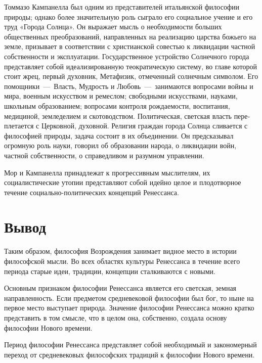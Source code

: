 \documentclass[14pt]{extarticle}
\begin{document}
Томмазо Кампанелла был одним из представителей итальянской философии природы; од­нако более значительную роль сыграло его социаль­ное учение и его труд «Города Солнца». Он выражает мысль о необходимости больших общественных преобразований, направленных на реа­лизацию царства божьего на земле, призывает в соот­ветствии с христианской совестью к ликвидации част­ной собственности и эксплуатации. Государственное устройство Солнечного города представляет собой идеализированную теократиче­скую систему, во главе которой стоит жрец, первый духовник, Метафизик, отмеченный солнечным симво­лом. Его помощники~---~Власть, Мудрость и Любовь~---~занимаются вопросами войны и мира, военным ис­кусством и ремеслом; свободными искусствами, нау­ками, школьным образованием; вопросами контроля рождаемости, воспитания, медициной, земледелием и скотоводством. Политическая, светская власть пере­плетается с Церковной, духовной. Религия граждан города Солнца сливается с философией природы, за­дача состоит в их объединении. Он предсказывал огромную роль науки, говорил об образовании народа, о ликви­дации войн, частной собственности, о справедливом и разумном управлении.

Мор и Кампанелла принадлежат к прогрессив­ным мыслителям, их социалистические утопии пред­ставляют собой идейно целое и плодотворное течение социально-политических концепций Ренессанса.

\section{Вывод}

Таким образом, философия Возрождения занимает видное ме­сто в истории философской мысли. Во всех областях культуры Ренессанса в течение всего периода старые идеи, традиции, концепции сталкиваются с новыми. 

Основным признаком философии Ренессанса явля­ется его светская, земная направленность. Если пред­метом средневековой философии был бог, то ныне на первое место выступает природа. Значение философии Ренессанса можно кратко представить в том смысле, что в целом она, собствен­но, создала основу философии Нового времени. 

Пе­риод философии Ренессанса представляет собой необ­ходимый и закономерный переход от средневековых философских традиций к философии Нового времени.
\end{document}
